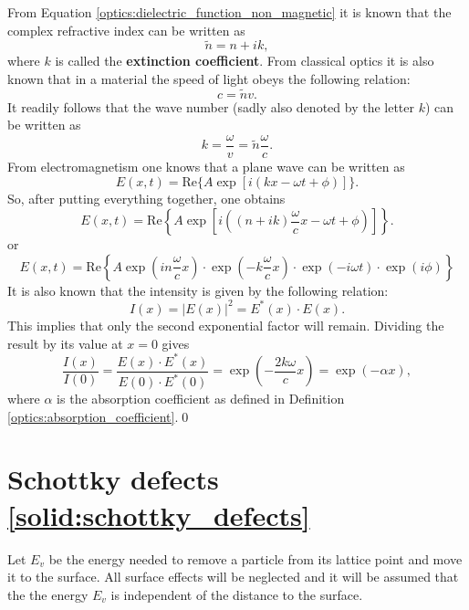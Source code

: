     From Equation \eqref{optics:dielectric_function_non_magnetic} it is known that the complex refractive index can be written as \[\widetilde{n} = n+ik,\] where $k$ is called the \textbf{extinction coefficient}. From classical optics it is also known that in a material the speed of light obeys the following relation: \[c = \widetilde{n}v.\] It readily follows that the wave number (sadly also denoted by the letter $k$) can be written as \[k = \frac{\omega}{v} = \widetilde{n}\frac{\omega}{c}.\] From electromagnetism one knows that a plane wave can be written as \[E(x,t) = \mathrm{Re}\big\{A\exp\left[i(kx - \omega t + \phi)\right]\big\}.\] So, after putting everything together, one obtains \[E(x,t) = \mathrm{Re}\left\{A\exp\left[i\left((n+ik)\frac{\omega}{c}x - \omega t + \phi\right)\right]\right\}.\] or \[E(x,t) = \mathrm{Re}\left\{A\exp\left(in\frac{\omega}{c}x\right)\cdot\exp\left(-k\frac{\omega}{c}x\right)\cdot\exp\left(-i\omega t\right)\cdot\exp\left(i\phi\right)\right\}\] It is also known that the intensity is given by the following relation:\[I(x) = |E(x)|^2 = E^*(x)\cdot E(x).\] This implies that only the second exponential factor will remain. Dividing the result by its value at $x=0$ gives \[\frac{I(x)}{I(0)} = \frac{E(x)\cdot E^*(x)}{E(0)\cdot E^*(0)} = \exp\left(-\frac{2k\omega}{c}x\right) = \exp(-\alpha x),\]
    where $\alpha$ is the absorption coefficient as defined in Definition \ref{optics:absorption_coefficient}.\qed

\section{Schottky defects \ref{solid:schottky_defects}}\label{deriv:schottky_defects}

    Let $E_v$ be the energy needed to remove a particle from its lattice point and move it to the surface. All surface effects will be neglected and it will be assumed that the the energy $E_v$ is independent of the distance to the surface.

